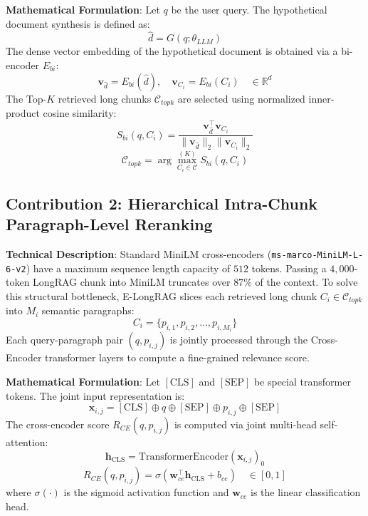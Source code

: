 \documentclass[11pt,a4paper]{article}
\begin{document}
\textbf{Mathematical Formulation}:
Let $q$ be the user query. The hypothetical document synthesis is defined as:
\begin{equation}
    \hat{d} = G(q; \theta_{LLM})
\end{equation}
The dense vector embedding of the hypothetical document is obtained via a bi-encoder $E_{bi}$:
\begin{equation}
    \mathbf{v}_{\hat{d}} = E_{bi}(\hat{d}), \quad \mathbf{v}_{C_i} = E_{bi}(C_i) \quad \in \mathbb{R}^d
\end{equation}
The Top-$K$ retrieved long chunks $\mathcal{C}_{topk}$ are selected using normalized inner-product cosine similarity:
\begin{equation}
    S_{bi}(q, C_i) = \frac{\mathbf{v}_{\hat{d}}^\top \mathbf{v}_{C_i}}{\|\mathbf{v}_{\hat{d}}\|_2 \|\mathbf{v}_{C_i}\|_2}
\end{equation}
\begin{equation}
    \mathcal{C}_{topk} = \arg\max_{C_i \in \mathcal{C}}^{(K)} S_{bi}(q, C_i)
\end{equation}

\subsection{Contribution 2: Hierarchical Intra-Chunk Paragraph-Level Reranking}
\textbf{Technical Description}: Standard MiniLM cross-encoders (\texttt{ms-marco-MiniLM-L-6-v2}) have a maximum sequence length capacity of $512$ tokens. Passing a $4,000$-token LongRAG chunk into MiniLM truncates over $87\%$ of the context. To solve this structural bottleneck, E-LongRAG slices each retrieved long chunk $C_i \in \mathcal{C}_{topk}$ into $M_i$ semantic paragraphs:
\begin{equation}
    C_i = \{ p_{i,1}, p_{i,2}, \dots, p_{i,M_i} \}
\end{equation}
Each query-paragraph pair $(q, p_{i,j})$ is jointly processed through the Cross-Encoder transformer layers to compute a fine-grained relevance score.

\textbf{Mathematical Formulation}:
Let $[\text{CLS}]$ and $[\text{SEP}]$ be special transformer tokens. The joint input representation is:
\begin{equation}
    \mathbf{x}_{i,j} = [\text{CLS}] \oplus q \oplus [\text{SEP}] \oplus p_{i,j} \oplus [\text{SEP}]
\end{equation}
The cross-encoder score $R_{CE}(q, p_{i,j})$ is computed via joint multi-head self-attention:
\begin{equation}
    \mathbf{h}_{\text{CLS}} = \text{TransformerEncoder}(\mathbf{x}_{i,j})_0
\end{equation}
\begin{equation}
    R_{CE}(q, p_{i,j}) = \sigma( \mathbf{w}_{ce}^\top \mathbf{h}_{\text{CLS}} + b_{ce} ) \quad \in [0, 1]
\end{equation}
where $\sigma(\cdot)$ is the sigmoid activation function and $\mathbf{w}_{ce}$ is the linear classification head.
\end{document}
